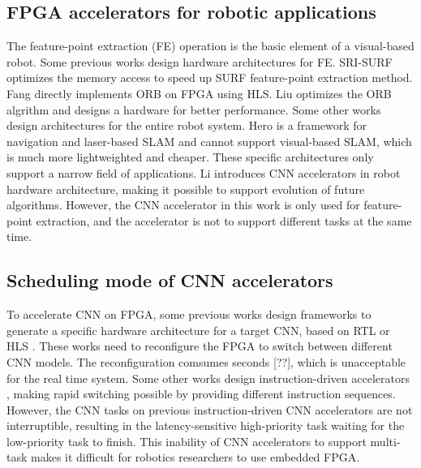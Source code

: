 \subsection{ FPGA accelerators for robotic applications }

The feature-point extraction (FE) operation is the basic element of a visual-based robot.
Some previous works design hardware architectures for FE.
SRI-SURF \cite{jia2016sri} optimizes the memory access to speed up SURF \cite{bay2006surf} feature-point extraction method. 
Fang \cite{fang2017fpga} directly implements ORB on FPGA using HLS. Liu \cite{liu2019eslam} optimizes the ORB algrithm and designs a hardware for better performance.
Some other works design architectures for the entire robot system. Hero \cite{shi2018hero} is a framework for navigation and laser-based SLAM and cannot support visual-based SLAM, which is much more lightweighted and cheaper. These specific architectures only support a narrow field of applications. 
Li \cite{li2019879gops} introduces CNN accelerators in robot hardware architecture, making it possible to support evolution of future algorithms. 
However, the CNN accelerator in this work\cite{li2019879gops} is only used for feature-point extraction, and the accelerator is not to support different tasks at the same time.



\subsection{ Scheduling mode of CNN accelerators }

To accelerate CNN on FPGA, some previous works design frameworks to generate a specific hardware architecture for a target CNN, based on  RTL \cite{li_high_2016} or HLS \cite{lu_evaluating_2017}. These works need to reconfigure the FPGA to switch between different CNN models. The reconfiguration comsumes seconds [??], which is unacceptable for the real time system.
Some other works design instruction-driven accelerators \cite{yu2018instruction,qiu2016going,guo2017angel}, making rapid switching possible by providing different instruction sequences. 
However, the CNN tasks on previous instruction-driven CNN accelerators are not interruptible, resulting in the latency-sensitive high-priority task waiting for the low-priority task to finish. This inability of CNN accelerators to support multi-task makes it difficult for robotics researchers to use embedded FPGA.

